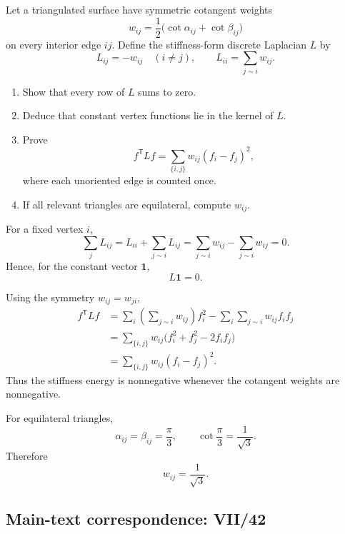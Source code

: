 \begin{problem}
\label{prob:cp-vii-0095}
Let a triangulated surface have symmetric cotangent weights
\[
w_{ij}=\frac12\bigl(\cot\alpha_{ij}+\cot\beta_{ij}\bigr)
\]
on every interior edge \(ij\).  Define the stiffness-form discrete
Laplacian \(L\) by
\[
L_{ij}=-w_{ij}\quad(i\ne j),
\qquad
L_{ii}=\sum_{j\sim i}w_{ij}.
\]

\begin{enumerate}
\item Show that every row of \(L\) sums to zero.
\item Deduce that constant vertex functions lie in the kernel of \(L\).
\item Prove
      \[
      f^{\mathsf T}Lf
      =
      \sum_{\{i,j\}}w_{ij}(f_i-f_j)^2,
      \]
      where each unoriented edge is counted once.
\item If all relevant triangles are equilateral, compute \(w_{ij}\).
\end{enumerate}
\end{problem}

\begin{solution}
For a fixed vertex \(i\),
\[
\sum_j L_{ij}
=
L_{ii}+\sum_{j\sim i}L_{ij}
=
\sum_{j\sim i}w_{ij}-\sum_{j\sim i}w_{ij}
=0.
\]
Hence, for the constant vector \(\mathbf 1\),
\[
L\mathbf 1=0.
\]

Using the symmetry \(w_{ij}=w_{ji}\),
\[
\begin{aligned}
f^{\mathsf T}Lf
&=
\sum_i\left(\sum_{j\sim i}w_{ij}\right)f_i^2
-\sum_i\sum_{j\sim i}w_{ij}f_if_j\\
&=
\sum_{\{i,j\}}w_{ij}
\bigl(f_i^2+f_j^2-2f_if_j\bigr)\\
&=
\sum_{\{i,j\}}w_{ij}(f_i-f_j)^2.
\end{aligned}
\]
Thus the stiffness energy is nonnegative whenever the cotangent weights
are nonnegative.

For equilateral triangles,
\[
\alpha_{ij}=\beta_{ij}=\frac{\pi}{3},
\qquad
\cot\frac{\pi}{3}=\frac1{\sqrt3}.
\]
Therefore
\[
\boxed{w_{ij}=\frac1{\sqrt3}}.
\]
\end{solution}

\subsection*{Main-text correspondence: VII/42}

